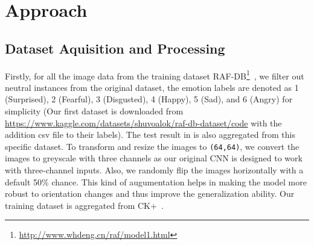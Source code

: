 




\section{Approach}
\label{sec:approach}

\subsection{Dataset Aquisition and Processing}
Firstly, 
for all the image data from the training dataset RAF-DB\footnote{\url{http://www.whdeng.cn/raf/model1.html}}~\cite{li2017reliable,li2019reliable}, 
we filter out neutral instances from the original dataset, 
the emotion labels are denoted as 1 (Surprised), 2 (Fearful), 3 (Disgusted), 
4 (Happy), 5 (Sad), and 6 (Angry) for simplicity 
(Our first dataset is downloaded from \url{https://www.kaggle.com/datasets/shuvoalok/raf-db-dataset/code} with the addition csv file to their labels). 
The test result in  is also aggregated from this specific dataset.
To transform and resize the images to \texttt{(64,64)}, 
we convert the images to greyscale with three channels as our original CNN is designed to work with three-channel inputs. 
Also, we randomly flip the images horizontally with a default 50\% chance. 
This kind of augumentation helps in making the model more robust to orientation changes and thus improve the generalization ability. 
Our training dataset is aggregated from CK+~\cite{LuceyCKSAM10}.

